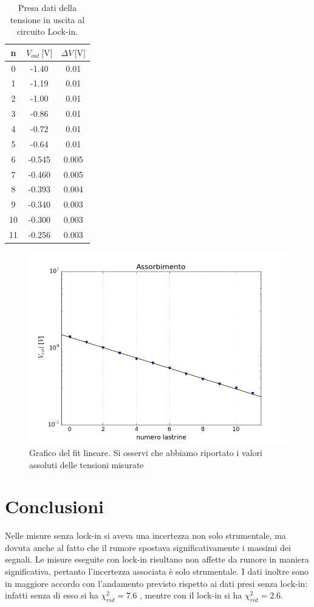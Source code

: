 \documentclass[10pt,a4paper]{article}
\begin{document}
\begin{table}
\centering
\begin{tabular}{|c|c|c|}
\hline
n	&	$V_{out}\,\mbox{[V]}$	&	$\Delta V\,\mbox{[V]}$\\
\hline
0  & -1.40 & 0.01\\
\hline
1   &-1.19  &0.01\\
\hline
2   &-1.00  &0.01\\
\hline
3   &-0.86  &0.01\\
\hline
4   &-0.72  &0.01\\
\hline
5   &-0.64  &0.01\\
\hline
6   &-0.545  &0.005\\
\hline
7   &-0.460  &0.005\\
\hline
8   &-0.393  &0.004\\
\hline
9   &-0.340  &0.003\\
\hline
10  &-0.300  &0.003\\
\hline
11  &-0.256  &0.003\\
\hline
\end{tabular}
\caption{Presa dati della tensione in uscita al circuito Lock-in.\label{tab:abs2}}
\end{table}

\begin{figure}[!htb]
  \centering
\includegraphics[scale=0.7]{plot-lin2.png}
\caption{Grafico del fit lineare. Si osservi che abbiamo riportato i valori assoluti delle tensioni misurate\label{plot2}}
\end{figure}

\section{Conclusioni}
Nelle misure senza lock-in si aveva una incertezza non solo strumentale, ma dovuta anche al fatto che il rumore spostava significativamente i massimi dei segnali.
Le misure eseguite con lock-in risultano non affette da rumore in maniera significativa, pertanto l'incertezza associata è solo strumentale.
I dati inoltre sono in maggiore accordo con l'andamento previsto rispetto ai dati presi senza lock-in: infatti senza di esso si ha $\chi_{rid} ^2 = 7.6$ ,  mentre con il lock-in si ha $\chi_{rid}^2 = 2.6$.%
\end{document}
